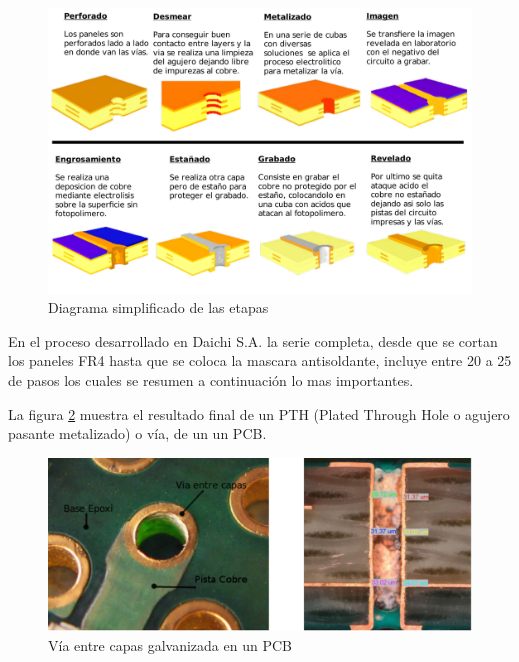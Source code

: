 \begin{figure}[h]
	\centering
	\includegraphics[width=1.0\textwidth]{Figures/Cap_2/diagrama_galvanizado_completo}
	\caption{ Diagrama simplificado de las etapas} \footnotemark \footnotemark
	\label{fig:diagrama_proceso}
\end{figure}


En el proceso desarrollado en Daichi S.A. la serie completa, desde que se cortan los paneles FR4 hasta que se coloca la mascara antisoldante, incluye entre 20 a 25 de pasos los cuales se resumen a continuación lo mas importantes.

La figura \ref{fig:galvanizado_pcb} muestra el resultado final de un PTH (Plated Through Hole o agujero pasante metalizado) o  vía, de un un PCB.
\begin{figure}[h]
	\centering
	\includegraphics[width=.8\textwidth]{Figures/Cap_2/galvanizado_pcb_2}
	\caption{Vía entre capas galvanizada en un PCB}
	\label{fig:galvanizado_pcb}
\end{figure}

